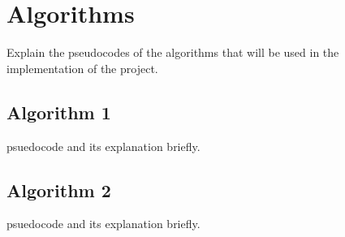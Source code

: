 \documentclass{scrreprt}
\begin{document}
\chapter{Algorithms}
Explain the pseudocodes of the algorithms that will be used in the implementation of the project.
\section{Algorithm 1}
psuedocode and its explanation briefly.
\section{Algorithm 2}
psuedocode and its explanation briefly.
\begin{thebibliography}{999}

\bibitem{} 
\bibitem{}

\bibitem{} 

\bibitem{} 

\bibitem{} 

\bibitem{} 



\end{thebibliography}
\end{document}
